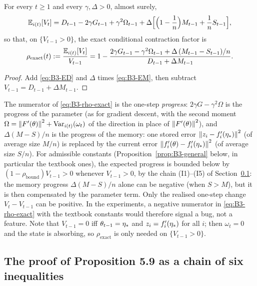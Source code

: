 \begin{proposition}\label{prop:B3-exact}
For every $t\ge1$ and every $\gamma,\Delta>0$, almost surely,
\begin{equation}\label{eq:B3-EV}
\mathbb{E}_{i(t)}[V_t]=D_{t-1}-2\gamma G_{t-1}+\gamma^2\Omega_{t-1}+\Delta\Big[\Big(1-\frac1n\Big)M_{t-1}+\frac1nS_{t-1}\Big] ,
\end{equation}
so that, on $\{V_{t-1}>0\}$, the exact conditional contraction factor is
\begin{equation}\label{eq:B3-rho-exact}
\rho_{\mathrm{exact}}(t):=\frac{\mathbb{E}_{i(t)}[V_t]}{V_{t-1}}
=1-\frac{2\gamma G_{t-1}-\gamma^2\Omega_{t-1}+\Delta\,(M_{t-1}-S_{t-1})/n}{D_{t-1}+\Delta M_{t-1}} .
\end{equation}
\end{proposition}
\begin{proof}
Add \eqref{eq:B3-ED} and $\Delta$ times \eqref{eq:B3-EM}, then subtract $V_{t-1}=D_{t-1}+\Delta M_{t-1}$.
\end{proof}

\begin{remark}\label{rem:B3-reading}
The numerator of \eqref{eq:B3-rho-exact} is the one-step \emph{progress}: $2\gamma G-\gamma^2\Omega$ is the progress of the parameter (as for gradient descent, with the second moment $\Omega=\left\|F'(\theta)\right\|^2+\operatorname{Var}_{i(t)}(\omega_t)$ of the direction in place of $\left\|F'(\theta)\right\|^2$), and $\Delta(M-S)/n$ is the progress of the memory: one stored error $\left\|z_i-f'_i(\eta_\ast)\right\|^2$ (of average size $M/n$) is replaced by the current error $\left\|f'_i(\theta)-f'_i(\eta_\ast)\right\|^2$ (of average size $S/n$). For admissible constants (Proposition~\ref{prop:B3-general} below, in particular the textbook ones), the expected progress is bounded below by $(1-\rho_{\mathrm{bound}})V_{t-1}>0$ whenever $V_{t-1}>0$, by the chain (I1)--(I5) of Section~\ref{sec:B3-chain}: the memory progress $\Delta(M-S)/n$ alone can be negative (when $S>M$), but it is then compensated by the parameter term. Only the realised one-step change $V_t-V_{t-1}$ can be positive. In the experiments, a negative numerator in \eqref{eq:B3-rho-exact} with the textbook constants would therefore signal a bug, not a feature. Note that $V_{t-1}=0$ iff $\theta_{t-1}=\eta_\ast$ and $z_i=f'_i(\eta_\ast)$ for all $i$; then $\omega_t=0$ and the state is absorbing, so $\rho_{\mathrm{exact}}$ is only needed on $\{V_{t-1}>0\}$.
\end{remark}

\subsection{The proof of Proposition 5.9 as a chain of six inequalities}\label{sec:B3-chain}

